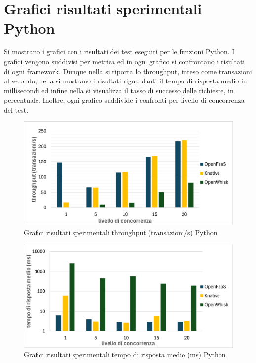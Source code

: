 \documentclass[12pt,a4paper,openany,twoside]{book}
\begin{document}
\section{Grafici risultati sperimentali Python}

Si mostrano i grafici con i risultati dei test eseguiti per le funzioni Python. I grafici vengono suddivisi per metrica ed in ogni grafico si confrontano i risultati di ogni framework. Dunque nella  si riporta lo throughput, inteso come transazioni al secondo; nella  si mostrano i risultati riguardanti il tempo di risposta medio in millisecondi ed infine nella  si visualizza il tasso di successo delle richieste, in percentuale. Inoltre, ogni grafico suddivide i confronti per livello di concorrenza del test.

\begin{figure}[ht]
    \centering
    \includegraphics[width=0.95\linewidth]{figures/graphs/throughput_python.pdf}
    \caption{Grafici risultati sperimentali throughput (transazioni/s) Python}
    \label{fig:grafici-throughput-python}
\end{figure}

\begin{figure}[ht]
    \centering
    \includegraphics[width=0.95\linewidth]{figures/graphs/tempoRisposta_python.pdf}
    \caption{Grafici risultati sperimentali tempo di risposta medio (ms) Python}
    \label{fig:grafici-tempo-risposta-python}
\end{figure}
\end{document}
